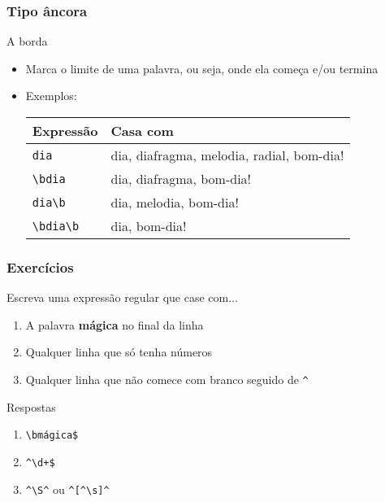 \documentclass{beamer}
\begin{document}
\begin{frame}[fragile]
 \frametitle{Tipo âncora}
 \begin{block}{A borda}
  \begin{itemize}
   \item Marca o limite de uma palavra, ou seja, onde ela começa e/ou termina
	\pause
   \item Exemplos:
	\begin{center}
	 \begin{tabular}{|l|l|}
	  \hline
	  \textbf{Expressão} & \textbf{Casa com} \\
	  \hline
	  \verb=dia= & dia, diafragma, melodia, radial, bom-dia! \\
	  \hline
	  \verb=\bdia= & dia, diafragma, bom-dia! \\
	  \hline
	  \verb=dia\b= & dia, melodia, bom-dia!  \\
	  \hline
	  \verb=\bdia\b= & dia, bom-dia! \\
	  \hline
	 \end{tabular}
	\end{center}
  \end{itemize}
 \end{block}
\end{frame}

\begin{frame}[fragile]
 \frametitle{Exercícios}
 \begin{block}{Escreva uma expressão regular que case com...}
  \begin{enumerate}
   \item A palavra \textbf{mágica} no final da linha
   \item Qualquer linha que só tenha números
   \item Qualquer linha que não comece com branco seguido de \verb=^=
  \end{enumerate}
 \end{block}

 \pause
 \begin{block}{Respostas}
  \begin{enumerate}
   \item \verb=\bmágica$=
	\pause
   \item \verb=^\d+$=
	\pause
   \item \verb=^\S^= ou \verb=^[^\s]^=
  \end{enumerate}
 \end{block}
\end{frame}
\end{document}
